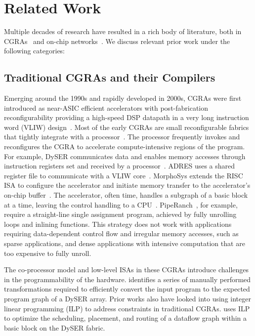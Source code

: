 \chapter{Related Work} \label{sec:related}

Multiple decades of research have resulted in a rich body of literature, both in CGRAs~\cite{cgraSurvey1, cgraSurvey2} and on-chip networks~\cite{ocn-synthesis}. We discuss relevant prior work under the following categories:

\section{Traditional CGRAs and their Compilers}
Emerging around the 1990s and rapidly developed in 2000s, CGRAs were first introduced as near-ASIC efficient accelerators with
post-fabrication reconfigurability providing a high-speed 
DSP datapath in a very long instruction word (VLIW) design~\cite{cgrasurvey,cgra1,cgra2,adres,trips,pactxpp,dyser,ti}.
Most of the early CGRAs are small reconfigurable fabrics that tightly integrate with a 
processor~\cite{dyser, adres,morphosys,piperanch}. 
The processor frequently invokes and reconfigures the CGRA to accelerate compute-intensive regions of the program.
For example, DySER communicates data and enables memory accesses through instruction registers set and
received by a processor~\cite{dyser}.
ADRES uses a shared register file to communicate with a VLIW core~\cite{adres}.
MorphoSys extends the RISC ISA to configure the accelerator and initiate memory transfer
to the accelerator's on-chip buffer~\cite{morphosys}.
The accelerator, often time, handles a subgraph of a basic block at a time, leaving the control
handling to a CPU~\cite{dyser, adres, piperanch}. 
PipeRanch~\cite{piperanch}, for example, require a straight-line single assignment program, 
achieved by fully unrolling loops and inlining functions.
This strategy does not work with applications requiring data-dependent control flow and irregular memory
accesses, such as sparse applications, and dense applications with intensive computation that are
too expensive to fully unroll.

The co-processor model and low-level ISAs in these CGRAs introduce challenges in the programmability
of the hardware.
\cite{dyser} identifies a series of manually performed transformations required to efficiently convert the input program to the expected program graph of a DySER array.
Prior works also have looked into using integer linear programming (ILP) to address constraints in traditional CGRAs. 
\cite{nowatzki} uses ILP to optimize the scheduling, placement, and routing of a dataflow graph within a basic block on the DySER fabric.

